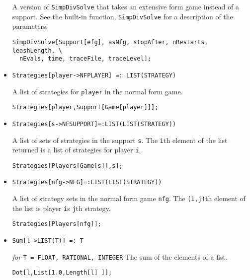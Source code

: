 \begin{itemize}
\bd 
A version of \verb+SimpDivSolve+ that takes an extensive form
game instead of a support.  See the built-in function,
\verb+SimpDivSolve+ for a description of the parameters.
\begin{verbatim}
SimpDivSolve[Support[efg], asNfg, stopAfter, nRestarts, leashLength, \
  nEvals, time, traceFile, traceLevel];
\end{verbatim} 
\ed

\item{}
\protect \large \begin{verbatim}
Strategies[player->NFPLAYER] =: LIST(STRATEGY)
\end{verbatim}\normalsize

\bd 
A list of strategies for \verb+player+ in the normal form game.  
\begin{verbatim}
Strategies[player,Support[Game[player]]];
\end{verbatim} 
\ed

\item{}
\protect \large \begin{verbatim}
Strategies[s->NFSUPPORT]=:LIST(LIST(STRATEGY))
\end{verbatim}\normalsize

\bd 
A list of sets of strategies in the support \verb+s+. The \verb+i+th
element of the list returned is a list of strategies for player
\verb+i+.   
\begin{verbatim}
Strategies[Players[Game[s]],s];
\end{verbatim} 
\ed


\item{}
\protect \large \begin{verbatim}
Strategies[nfg->NFG]=:LIST(LIST(STRATEGY))
\end{verbatim}\normalsize

\bd 
A list of strategy sets in the normal form game \verb+nfg+. The
\verb+(i,j)+th element of the list is player \verb+i+s \verb+j+th
strategy.  
\begin{verbatim}
Strategies[Players[nfg]];
\end{verbatim} 
\ed

\item{}
\protect \large \begin{verbatim}
Sum[l->LIST(T)] =: T
\end{verbatim}\normalsize

{\it for} {\tt T = FLOAT, RATIONAL, INTEGER}
\bd 
The sum of the elements of a list.  
\begin{verbatim}
Dot[l,List[1.0,Length[l] ]];
\end{verbatim} 
\ed


\end{itemize}
